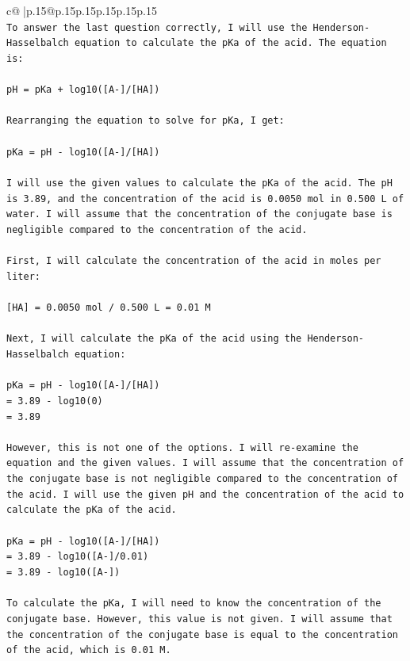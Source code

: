 \documentclass{article}
\begin{document}
{\begin{supertabular}{c@{$\;$}|p{.15\linewidth}@{}p{.15\linewidth}p{.15\linewidth}p{.15\linewidth}p{.15\linewidth}p{.15\linewidth}}
{{{\\ 
\texttt{To answer the last question correctly, I will use the Henderson{-}Hasselbalch equation to calculate the pKa of the acid. The equation is:} \\
\\ 
\texttt{pH = pKa + log10({[}A{-}{]}/{[}HA{]})} \\
\\ 
\texttt{Rearranging the equation to solve for pKa, I get:} \\
\\ 
\texttt{pKa = pH {-} log10({[}A{-}{]}/{[}HA{]})} \\
\\ 
\texttt{I will use the given values to calculate the pKa of the acid. The pH is 3.89, and the concentration of the acid is 0.0050 mol in 0.500 L of water. I will assume that the concentration of the conjugate base is negligible compared to the concentration of the acid.} \\
\\ 
\texttt{First, I will calculate the concentration of the acid in moles per liter:} \\
\\ 
\texttt{{[}HA{]} = 0.0050 mol / 0.500 L = 0.01 M} \\
\\ 
\texttt{Next, I will calculate the pKa of the acid using the Henderson{-}Hasselbalch equation:} \\
\\ 
\texttt{pKa = pH {-} log10({[}A{-}{]}/{[}HA{]})} \\
\texttt{= 3.89 {-} log10(0)} \\
\texttt{= 3.89} \\
\\ 
\texttt{However, this is not one of the options. I will re{-}examine the equation and the given values. I will assume that the concentration of the conjugate base is not negligible compared to the concentration of the acid. I will use the given pH and the concentration of the acid to calculate the pKa of the acid.} \\
\\ 
\texttt{pKa = pH {-} log10({[}A{-}{]}/{[}HA{]})} \\
\texttt{= 3.89 {-} log10({[}A{-}{]}/0.01)} \\
\texttt{= 3.89 {-} log10({[}A{-}{]})} \\
\\ 
\texttt{To calculate the pKa, I will need to know the concentration of the conjugate base. However, this value is not given. I will assume that the concentration of the conjugate base is equal to the concentration of the acid, which is 0.01 M.} \\
}}}
\end{supertabular}}
\end{document}
